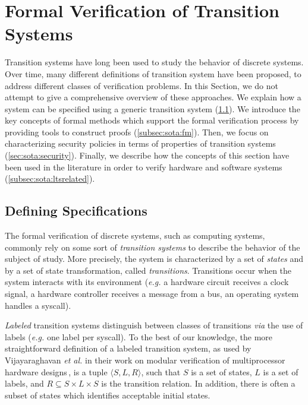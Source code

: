 \section{Formal Verification of Transition Systems}
\label{sec:sota:formalisms}

Transition systems have long been used to study the behavior of discrete
systems.
%
Over time, many different definitions of transition system have been proposed,
to address different classes of verification problems.
%
In this Section, we do not attempt to give a comprehensive overview of these
approaches.
%
We explain how a system can be specified using a generic transition system
(\ref{subsec:sota:ltsdef}).
%
We introduce the key concepts of formal methods which support the formal
verification process by providing tools to construct proofs
(\ref{subsec:sota:fm}).
%
Then, we focus on characterizing security policies in terms of properties of
transition systems (\ref{sec:sota:security}).
%
Finally, we describe how the concepts of this section have been used in the
literature in order to verify hardware and software systems
(\ref{subsec:sota:ltsrelated}).

\subsection{Defining Specifications}
\label{subsec:sota:ltsdef}

The formal verification of discrete systems, such as computing systems, commonly
rely on some sort of \emph{transition systems} to describe the behavior of the
subject of study.
%
More precisely, the system is characterized by a set of \emph{states} and by a
set of state transformation, called \emph{transitions}.
%
Transitions occur when the system interacts with its environment (\emph{e.g.} a
hardware circuit receives a clock signal, a hardware controller receives a
message from a bus, an operating system handles a syscall).

\emph{Labeled} transition systems distinguish between classes of transitions
\emph{via} the use of labels (\emph{e.g.} one label per syscall).
%
To the best of our knowledge, the more straightforward definition of a labeled transition system, as used by Vijayaraghavan \emph{et
  al.} in their work on modular verification of multiprocessor hardware
designs\,\cite{vijayaraghavan2015modular}, is a tuple
\( \langle S, L, R \rangle \), such that \( S \) is a set of states, \( L \) is
a set of labels, and \( R \subseteq S \times L \times S \) is the transition
relation.
%
In addition, there is often a subset of states which identifies acceptable
initial states.


